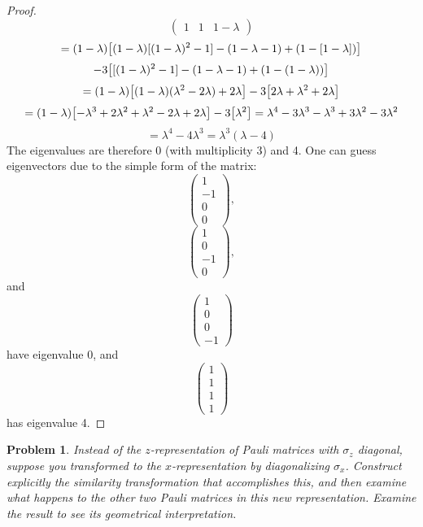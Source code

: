 \documentclass{article}
\newtheorem{plm}{Problem}
\begin{document}
\begin{proof}
\[\begin{pmatrix}
      1 & 1 & 1 - \lambda
    \end{pmatrix}
  \]
  \[
    =(1 - \lambda)\qty[(1 - \lambda)[(1 - \lambda)^{2} - 1] - (1-\lambda - 1) + (1 - [1 - \lambda])] \]
  \[- 3\qty[[(1-\lambda)^{2} - 1] - (1 - \lambda - 1) + ( 1 - (1 - \lambda))]
  \]
  \[
    = (1 - \lambda)\qty[(1 - \lambda)(\lambda^{2}-2\lambda) + 2\lambda] - 3\qty[ 2\lambda + \lambda^{2} + 2\lambda]
  \]
  \[
    = (1 - \lambda)\qty[-\lambda^{3} + 2\lambda^{2} + \lambda^{2} - 2\lambda + 2 \lambda] - 3\qty[\lambda^{2}]
    = \lambda^{4} - 3\lambda^{3} - \lambda^{3} + 3\lambda^{2}- 3\lambda^{2}
  \]
  \[
    = \lambda ^{4} - 4\lambda^{3}  =  \lambda^{3}(\lambda - 4)
  \]
  The eigenvalues are therefore 0 (with multiplicity 3) and 4.
  One can guess eigenvectors due to the simple form of the matrix:
  \[
    \begin{pmatrix}
      1 \\
      -1 \\
      0 \\
      0
    \end{pmatrix},
  \]
  \[
    \begin{pmatrix}
    1 \\
    0 \\
    -1 \\
    0
    \end{pmatrix},
  \]
  and
  \[
    \begin{pmatrix}
      1 \\
      0 \\
      0 \\
      -1
    \end{pmatrix}
  \]
  have eigenvalue 0, and
  \[
    \begin{pmatrix}
      1 \\
      1 \\
      1 \\
      1
    \end{pmatrix}
  \]
  has eigenvalue 4.
\end{proof}

\begin{plm}
  Instead of the $z$-representation of Pauli matrices with $\sigma_{z}$ diagonal,
  suppose you transformed to the $x$-representation by diagonalizing $\sigma_{x}$.
  Construct explicitly the similarity transformation that accomplishes this,
  and then examine what happens to the other two Pauli matrices in this new representation.
  Examine the result to see its geometrical interpretation.
\end{plm}
\end{document}
